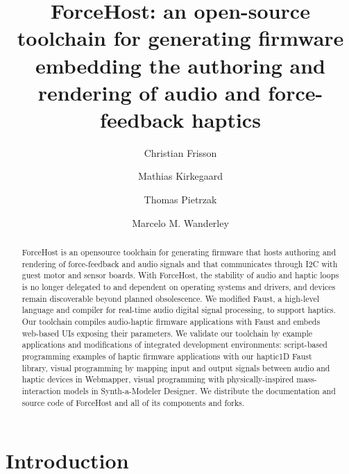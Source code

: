 \documentclass[sigconf]{nimeart}
\begin{document}
\title[ForceHost: an open-source toolchain for generating firmware…]{ForceHost: an open-source toolchain for generating firmware embedding the authoring and rendering of audio and force-feedback haptics}
\author{Christian Frisson}
\author{Mathias Kirkegaard}
\author{Thomas Pietrzak}
\author{Marcelo M. Wanderley}
\renewcommand{\shortauthors}{Frisson et al.}
\begin{abstract}
ForceHost is an opensource toolchain for generating firmware that hosts authoring and rendering of force-feedback and audio signals and that communicates through I2C with guest motor and sensor boards. With ForceHost, the stability of audio and haptic loops is no longer delegated to and dependent on operating systems and drivers, and devices remain discoverable beyond planned obsolescence. We modified Faust, a high-level language and compiler for real-time audio digital signal processing, to support haptics. Our toolchain compiles audio-haptic firmware applications with Faust and embeds web-based UIs exposing their parameters. We validate our toolchain by example applications and modifications of integrated development environments: script-based programming examples of haptic firmware applications with our haptic1D Faust library, visual programming by mapping input and output signals between audio and haptic devices in Webmapper, visual programming with physically-inspired mass-interaction models in Synth-a-Modeler Designer. We distribute the documentation and source code of ForceHost and all of its components and forks.
\end{abstract}

\maketitle
\section{Introduction}\label{introduction}
\end{document}
